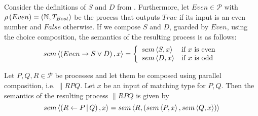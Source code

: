 \begin{example}
\label{exp:sem_chice}
Consider the definitions of $S$ and $D$ from . Furthermore, let $Even \in \mathcal{P}$ with $\rho \left( Even \right) = \left( \mathbb{N}, T_{Bool} \right)$ be the process that outputs $True$ if its input is an even number and $False$ otherwise. If we compose $S$ and $D$, guarded by $Even$, using the choice composition, the semantics of the resulting process is as follows:
  \begin{equation*}
    sem \left\langle \left( Even \to S \vee D \right), x \right\rangle = \left\{\begin{array}{ll}
      sem \left\langle S, x \right\rangle & \text{if } x \text{ is even} \\
      sem \left\langle D, x \right\rangle & \text{if } x \text{ is odd}
    \end{array}\right.
  \end{equation*}
  \hfill\qedsymbol
\end{example}


\begin{definition}
\label{def:sem_parallel}
Let $P, Q, R \in \mathcal{P}$ be processes and let them be composed using parallel composition, i.e. $\parallel{R}{P}{Q}$. Let $x$ be an input of matching type for $P, Q$. Then the semantics of the resulting process $\parallel{R}{P}{Q}$ is given by %
  \begin{equation}
    \label{eqn:sem_parallel}
    sem \left\langle \left( R \gets P \, | \, Q \right), x \right\rangle = sem \left\langle R, \left( sem \left\langle P, x \right\rangle, sem \left\langle Q, x \right\rangle \right) \right\rangle
  \end{equation}
  \hfill\qedsymbol
\end{definition}


